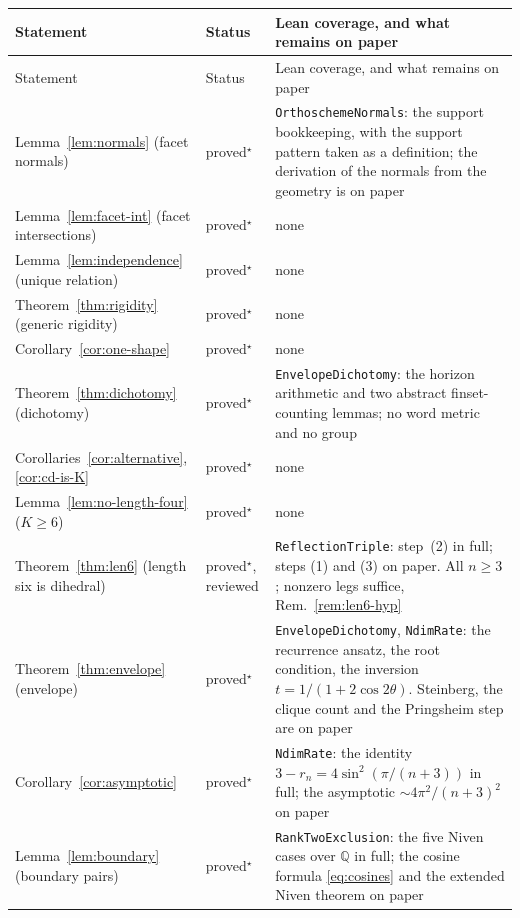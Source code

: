 \documentclass[11pt,a4paper]{article}
\newcommand{\Q}{\mathbb{Q}}
\theoremstyle{definition}
\theoremstyle{remark}
\theoremstyle{plain}
\begin{document}
\footnotesize
\renewcommand{\arraystretch}{1.15}
\begin{longtable}{@{}p{} p{} p{}@{}}
\toprule
Statement & Status & Lean coverage, and what remains on paper \\
\midrule
\endfirsthead
\toprule
Statement & Status & Lean coverage, and what remains on paper \\
\midrule
\endhead
Lemma~\ref{lem:normals} (facet normals)          & proved$^\star$ & \texttt{OrthoschemeNormals}: the support bookkeeping, with the support pattern taken as a definition; the derivation of the normals from the geometry is on paper \\
Lemma~\ref{lem:facet-int} (facet intersections)  & proved$^\star$ & none \\
Lemma~\ref{lem:independence} (unique relation)   & proved$^\star$ & none \\
Theorem~\ref{thm:rigidity} (generic rigidity)    & proved$^\star$ & none \\
Corollary~\ref{cor:one-shape}                    & proved$^\star$ & none \\
Theorem~\ref{thm:dichotomy} (dichotomy)          & proved$^\star$ & \texttt{EnvelopeDichotomy}: the horizon arithmetic and two abstract finset-counting lemmas; no word metric and no group \\
Corollaries~\ref{cor:alternative}, \ref{cor:cd-is-K} & proved$^\star$ & none \\
Lemma~\ref{lem:no-length-four} ($K\ge6$)         & proved$^\star$ & none \\
Theorem~\ref{thm:len6} (length six is dihedral)  & proved$^\star$, reviewed & \texttt{ReflectionTriple}: step~(2) in full; steps (1) and (3) on paper. All $n\ge3$; nonzero legs suffice, Rem.~\ref{rem:len6-hyp} \\
Theorem~\ref{thm:envelope} (envelope)            & proved$^\star$ & \texttt{EnvelopeDichotomy}, \texttt{NdimRate}: the recurrence ansatz, the root condition, the inversion $t=1/(1+2\cos2\theta)$. Steinberg, the clique count and the Pringsheim step are on paper \\
Corollary~\ref{cor:asymptotic}                   & proved$^\star$ & \texttt{NdimRate}: the identity $3-r_n=4\sin^2(\pi/(n+3))$ in full; the asymptotic $\sim4\pi^2/(n+3)^2$ on paper \\
Lemma~\ref{lem:boundary} (boundary pairs)        & proved$^\star$ & \texttt{RankTwoExclusion}: the five Niven cases over $\Q$ in full; the cosine formula \eqref{eq:cosines} and the extended Niven theorem on paper \\

\end{longtable}
\end{document}

